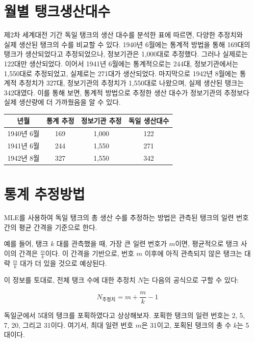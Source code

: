 \documentclass[
  letterpaper,
  chapter,a4paper,showtrims,openright,hidelinks]{oblivoir}
\begin{document}
\hypertarget{uxc6d4uxbcc4-uxd0f1uxd06cuxc0dduxc0b0uxb300uxc218}{%
\section{월별
탱크생산대수}\label{uxc6d4uxbcc4-uxd0f1uxd06cuxc0dduxc0b0uxb300uxc218}}

제2차 세계대전 기간 독일 탱크의 생산 대수를 분석한 표에 따르면, 다양한
추정치와 실제 생산된 탱크의 수를 비교할 수 있다. 1940년 6월에는 통계적
방법을 통해 169대의 탱크가 생산되었다고 추정되었으나, 정보기관은
1,000대로 추정했다. 그러나 실제로는 122대만 생산되었다. 이어서 1941년
6월에는 통계적으로는 244대, 정보기관에서는 1,550대로 추정되었고,
실제로는 271대가 생산되었다. 마지막으로 1942년 8월에는 통계적 추정치가
327대, 정보기관의 추정치가 1,550대로 나왔으며, 실제 생산된 탱크는
342대였다. 이를 통해 보면, 통계적 방법으로 추정한 생산 대수가 정보기관의
추정보다 실제 생산량에 더 가까웠음을 알 수 있다.

\begin{longtable}[]{@{}cccc@{}}
\toprule\noalign{}
년월 & 통계 추정 & 정보기관 추정 & 독일 생산대수 \\
\midrule\noalign{}
\endhead
\bottomrule\noalign{}
\endlastfoot
1940년 6월 & 169 & 1,000 & 122 \\
1941년 6월 & 244 & 1,550 & 271 \\
1942년 8월 & 327 & 1,550 & 342 \\
\end{longtable}

\hypertarget{uxd1b5uxacc4-uxcd94uxc815uxbc29uxbc95}{%
\section{통계 추정방법}\label{uxd1b5uxacc4-uxcd94uxc815uxbc29uxbc95}}

MLE를 사용하여 독일 탱크의 총 생산 수를 추정하는 방법은 관측된 탱크의
일련 번호 간의 평균 간격을 기준으로 한다.

예를 들어, 탱크 \(k\) 대를 관측했을 때, 가장 큰 일련 번호가 \(m\)이면,
평균적으로 탱크 사이의 간격은 \(\frac{m}{k}\)이다. 이 간격을 기반으로,
번호 \(m\) 이후에 아직 관측되지 않은 탱크는 대략 \(\frac{m}{k}\) 대가 더
있을 것으로 예상된다.

이 정보를 토대로, 전체 탱크 수에 대한 추정치 \(N\)는 다음의 공식으로
구할 수 있다:

\[
N_{\text{추정치}} = m + \frac{m}{k} - 1
\]

독일군에서 5대의 탱크를 포획하였다고 상상해보자. 포획한 탱크의 일련
번호는 2, 5, 7, 20, 그리고 31이다. 여기서, 최대 일련 번호 \(m\)은
31이고, 포획된 탱크의 총 수 \(k\)는 5대이다.
\end{document}

